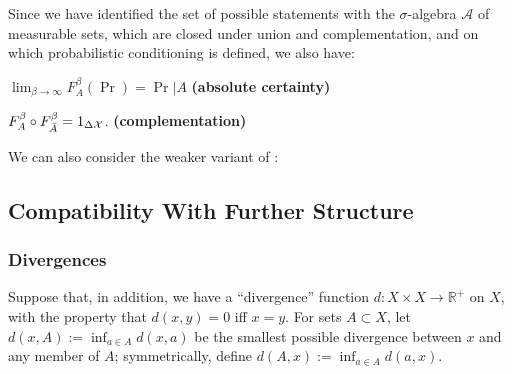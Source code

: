 \documentclass{article}
\DeclareMathOperator{\supp}{\mathrm{Supp}}
\begin{document}

Since we have identified the set of possible statements with the $\sigma$-algebra $\mathcal A$ of measurable sets, which are closed under union and complementation, and on which probabilistic conditioning is defined, we also have:

\begin{URaxioms}
    \item $\displaystyle \lim_{\beta\to\infty} F^\beta_A (\Pr) = \Pr|A$
    \hfill \textbf{(absolute certainty)} \label{ax:certainty}


    \item
    $F^\beta_A \circ F_{\bar A}^\beta = 1_{\Delta\mathcal X}$.
        \hfill \textbf{(complementation)} \label{ax:comp}
\end{URaxioms}


We can also consider the weaker variant of :



\subsection{Compatibility With Further Structure}
\subsubsection*{Divergences}
Suppose that, in addition, we have a ``divergence'' function $d : X \times X \to \mathbb R^+$ on $X$, with the property that $d(x,y) = 0$ iff $x = y$.
For sets $A \subset X$, let $d(x, A) := \inf_{a \in A} d(x,a)$ be the smallest possible divergence between $x$ and any member of $A$; symmetrically, define $d(A, x) := \inf_{a \in A} d(a,x)$.
\end{document}
